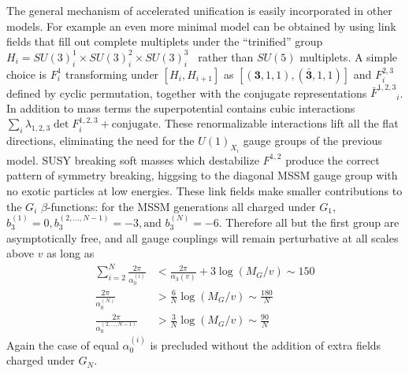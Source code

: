 \documentclass[a4paper,prl,twocolumn]{revtex4}
\begin{document}
The general mechanism of accelerated unification is easily
incorporated in other models.  For example an even more minimal model
can be obtained by using link fields that fill out complete multiplets
under the ``trinified'' group $H_i=SU(3)^1_i \times SU(3)^2_i \times
SU(3)^3_i$~\cite{Glashow:1984gc,Lazarides:1993sn} rather than $SU(5)$
multiplets. A simple choice is $F^1_i$ transforming under $[H_i,
H_{i+1}]$ as $[(\mathbf{3},1,1),(\mathbf{\bar 3},1,1)]$ and
$F^{2,3}_i$ defined by cyclic permutation, together with the conjugate
representations ${\bar F^{1,2,3}}_i$.  In addition to mass terms the
superpotential contains cubic interactions $\sum_i \lambda_{1,2,3}
\det F^{1,2,3}_i+\text{conjugate}$.  These renormalizable interactions
lift all the flat directions, eliminating the need for the
$U(1)_{X_i}$ gauge groups of the previous model. SUSY breaking soft
masses which destabilize $F^{1,2}$ produce the correct pattern of
symmetry breaking, higgsing to the diagonal MSSM gauge group with no
exotic particles at low energies. These link fields make smaller
contributions to the $G_i$ $\beta$-functions: for the MSSM generations
all charged under $G_1$, $b_3^{(1)} = 0, b_3^{(2,\dots,N-1)}=-3,
\text{and } b_3^{(N)}=-6$. Therefore all but the first group are
asymptotically free, and all gauge couplings will remain perturbative
at all scales above $v$ as long as
\begin{align}
  \label{eq:12}
  \sum_{i=2}^N \frac{2\pi}{\alpha_0^{(i)}} & < \frac{2\pi}{\alpha_3(v)}
  + 3 \log \left(M_G/v\right) \sim 150 \\
    \label{eq:12a}
  \frac{2\pi}{\alpha_0^{(N)}} &>  \frac{6}{N} \log
    \left(M_G/v\right) \sim \frac{180}{N} \\ 
    \label{eq:12b}
  \frac{2\pi}{\alpha_0^{(2,\dots,N-1)}} &>  \frac{3}{N} \log
    \left(M_G/v\right) \sim \frac{90}{N}
\end{align}
Again the case of equal $\alpha_0^{(i)}$ is precluded without the
addition of extra fields charged under $G_N$.
\end{document}
